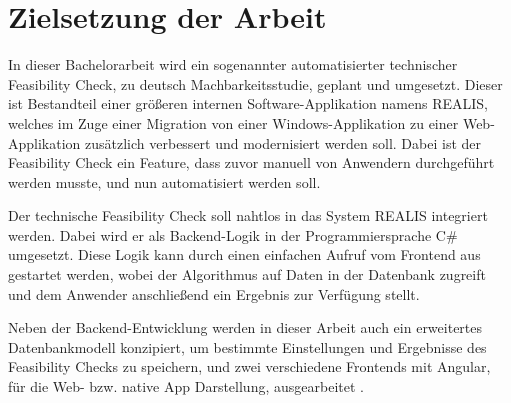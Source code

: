 \section{Zielsetzung der Arbeit}
In dieser Bachelorarbeit wird ein sogenannter automatisierter technischer Feasibility Check, zu deutsch Machbarkeitsstudie, geplant und umgesetzt. Dieser ist Bestandteil einer größeren internen Software-Applikation namens \gls{REALIS}, welches
im Zuge einer Migration von einer Windows-Applikation zu einer Web-Applikation zusätzlich verbessert und modernisiert werden soll. Dabei ist der Feasibility Check ein Feature, dass zuvor manuell von Anwendern durchgeführt werden musste, und nun automatisiert werden soll.

Der technische Feasibility Check soll nahtlos in das System \gls{REALIS} integriert werden. Dabei wird er als Backend-Logik in der Programmiersprache C\# umgesetzt. Diese Logik kann durch einen einfachen Aufruf vom Frontend aus gestartet werden, wobei der Algorithmus auf Daten in der Datenbank zugreift und dem Anwender anschließend ein Ergebnis zur Verfügung stellt.

Neben der Backend-Entwicklung werden in dieser Arbeit auch ein erweitertes Datenbankmodell konzipiert, um bestimmte Einstellungen und Ergebnisse des Feasibility Checks zu speichern, und zwei verschiedene Frontends mit Angular, für die Web- bzw. native App Darstellung, ausgearbeitet .